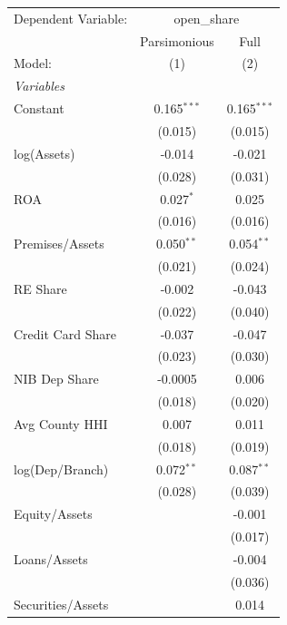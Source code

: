 \begingroup
\centering
\begin{tabular}{lcc}
   \tabularnewline \midrule \midrule
   Dependent Variable: & \multicolumn{2}{c}{open\_share}\\
                         & Parsimonious  & Full \\   
   Model:                & (1)           & (2)\\  
   \midrule
   \emph{Variables}\\
   Constant              & 0.165$^{***}$ & 0.165$^{***}$\\   
                         & (0.015)       & (0.015)\\   
   log(Assets)           & -0.014        & -0.021\\   
                         & (0.028)       & (0.031)\\   
   ROA                   & 0.027$^{*}$   & 0.025\\   
                         & (0.016)       & (0.016)\\   
   Premises/Assets       & 0.050$^{**}$  & 0.054$^{**}$\\   
                         & (0.021)       & (0.024)\\   
   RE Share              & -0.002        & -0.043\\   
                         & (0.022)       & (0.040)\\   
   Credit Card Share     & -0.037        & -0.047\\   
                         & (0.023)       & (0.030)\\   
   NIB Dep Share         & -0.0005       & 0.006\\   
                         & (0.018)       & (0.020)\\   
   Avg County HHI        & 0.007         & 0.011\\   
                         & (0.018)       & (0.019)\\   
   log(Dep/Branch)       & 0.072$^{**}$  & 0.087$^{**}$\\   
                         & (0.028)       & (0.039)\\   
   Equity/Assets         &               & -0.001\\   
                         &               & (0.017)\\   
   Loans/Assets          &               & -0.004\\   
                         &               & (0.036)\\   
   Securities/Assets     &               & 0.014\\   

\end{tabular}
